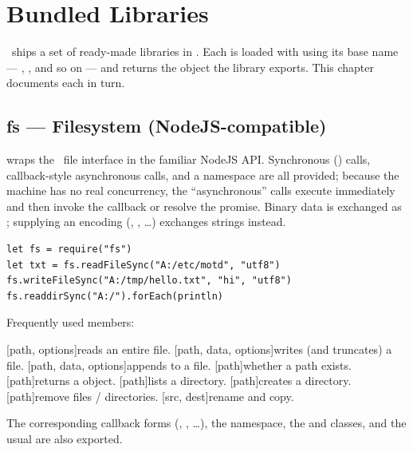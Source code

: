 \chapter{Bundled Libraries}

\thedos\ ships a set of ready-made libraries in . Each is loaded with  using its base name --- , , and so on --- and returns the object the library exports. This chapter documents each in turn.

\section{fs --- Filesystem (NodeJS-compatible)}

 wraps the \thedos\ file interface in the familiar NodeJS  API. Synchronous () calls, callback-style asynchronous calls, and a  namespace are all provided; because the machine has no real concurrency, the ``asynchronous'' calls execute immediately and then invoke the callback or resolve the promise. Binary data is exchanged as ; supplying an encoding (, , \dots) exchanges strings instead.

\begin{lstlisting}
let fs = require("fs")
let txt = fs.readFileSync("A:/etc/motd", "utf8")
fs.writeFileSync("A:/tmp/hello.txt", "hi", "utf8")
fs.readdirSync("A:/").forEach(println)
\end{lstlisting}

Frequently used members:
\begin{outline}
\1[path, options]{reads an entire file.}
\1[path, data, options]{writes (and truncates) a file.}
\1[path, data, options]{appends to a file.}
\1[path]{whether a path exists.}
\1[path]{returns a  object.}
\1[path]{lists a directory.}
\1[path]{creates a directory.}
\1[path]{remove files / directories.}
\1[src, dest]{rename and copy.}
\1
\end{outline}
The corresponding callback forms (, , \dots), the  namespace, the  and  classes, and the usual  are also exported.

